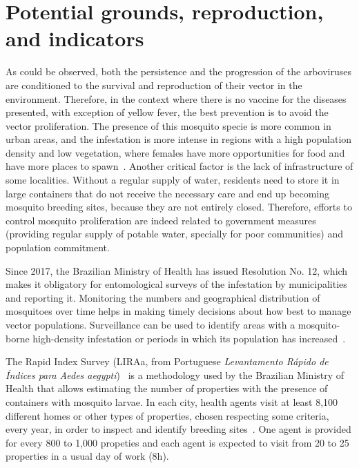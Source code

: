 \section{Potential grounds, reproduction, and indicators}
As could be observed, both the persistence and the progression of the arboviruses are conditioned to the survival and reproduction of their vector in the environment.
Therefore, in the context where there is no vaccine for the diseases presented, with exception of yellow fever, the best prevention is to avoid the vector proliferation.
The presence of this mosquito specie is more common in urban areas, and the infestation is more intense in regions with a high population density and low vegetation, where females have more opportunities for food and have more places to spawn~\cite{lambrechts2012vector}.
Another critical factor is the lack of infrastructure of some localities.
Without a regular supply of water, residents need to store it in large containers that do not receive the necessary care and end up becoming mosquito breeding sites, because they are not entirely closed.
Therefore, efforts to control mosquito proliferation are indeed related to government measures (providing regular supply of potable water, specially for poor communities) and population commitment.

Since 2017, the Brazilian Ministry of Health has issued Resolution No. 12, which makes it obligatory for entomological surveys of the \Aedes infestation by municipalities and reporting it. Monitoring the numbers and geographical distribution of mosquitoes over time helps in making timely decisions about how best to manage vector populations.
Surveillance can be used to identify areas with a mosquito-borne high-density infestation or periods in which its population has increased~\cite{brasil2017msresolution}.

The \Aedes Rapid Index Survey (LIRAa, from Portuguese \textit{Levantamento Rápido de Índices para Aedes aegypti})~\cite{brasil2013LIRAa} is a methodology used by the Brazilian Ministry of Health that allows estimating the number of properties with the presence of containers with mosquito larvae.
In each city, health agents visit at least 8,100 different homes or other types of properties, chosen respecting some criteria, every year, in order to inspect and identify breeding sites~\cite{brasil2009diretrizes}.
One agent is provided for every 800 to 1,000 propeties and each agent is expected to visit from 20 to 25 properties in a usual day of work (8h).

